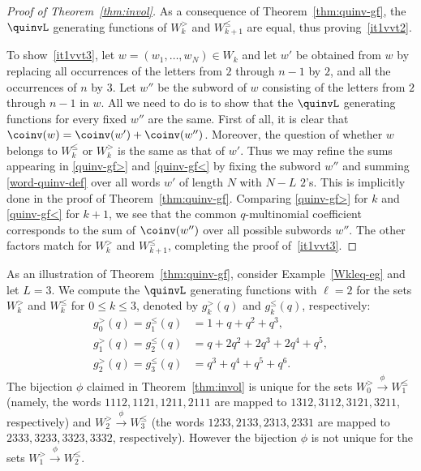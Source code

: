\begin{proof}[Proof of Theorem~\ref{thm:invol}]
As a consequence of Theorem~\ref{thm:quinv-gf}, the $\quinvL$ generating functions of $W_{k}^>$ and $W_{k+1}^\leq$ are equal, thus proving~\ref{it1vvt2}. 

To show~\ref{it1vvt3}, let $w = (w_1, \dots, w_N) \in W_k$ and let $w'$ be obtained from $w$ by replacing all
occurrences of the letters from $2$ through $n-1$ by $2$, and all the occurrences of $n$ by $3$.
Let $w''$ be the subword of $w$ consisting of the letters from $2$ through $n-1$ in $w$. 
All we need to do is to show that the $\quinvL$ generating functions for every fixed $w''$ are the same.
First of all, it is clear that $\coinv(w) = \coinv(w') + \coinv(w'')$.  Moreover, the question of whether $w$
belongs to $W_k^\leq$ or $W_k^>$ is the same as that of $w'$. 
Thus we may refine the sums appearing in \eqref{quinv-gf>} and \eqref{quinv-gf<} by fixing the subword $w''$ and summing \eqref{word-quinv-def} over all words $w'$ of length $N$ with $N-L$ $2$'s.
This is implicitly done in the proof of Theorem~\ref{thm:quinv-gf}. Comparing \eqref{quinv-gf>} for $k$ and \eqref{quinv-gf<} for $k+1$, we see that the common $q$-multinomial coefficient corresponds to the sum of $\coinv(w'')$ over all possible subwords $w''$. The other factors match for $W_k^>$ and $W_{k+1}^\leq$, completing the proof of~\ref{it1vvt3}.
\end{proof}


\begin{example}
\label{eg:W<>}
As an illustration of Theorem~\ref{thm:quinv-gf}, consider Example~\ref{Wkleq-eg} and let $L= 3$. We compute the $\quinvL$ generating functions with $\ell = 2$ for the sets $W_k^>$ and $W_k^\leq$ for $0\leq k\leq 3$, denoted by $g_k^>(q)$ and $g_k^\leq(q)$, respectively:
\begin{equation*}
\begin{split}
g_0^>(q)=g_1^\leq(q)&=1+q+q^2+q^3,\\
g_1^>(q)=g_2^\leq(q)&=q+2q^2+2q^3+2q^4+q^5,\\
g_2^>(q)=g_3^\leq(q)&=q^3+q^4+q^5+q^6.
\end{split}
\end{equation*}
The bijection $\phi$ claimed in Theorem~\ref{thm:invol} is unique for the sets $W_0^> \xrightarrow{\phi} W_1^\leq$ (namely, the words $1112,1121,1211,2111$ are mapped to $1312,3112,3121,3211$, respectively) and $W_2^> \xrightarrow{\phi} W_3^\leq$ (the words $1233,2133,2313,2331$ are mapped to\linebreak $2333,3233,3323,3332$, respectively). However the bijection $\phi$ is not unique for the sets $W_1^> \xrightarrow{\phi} W_2^\leq$.
\end{example}


